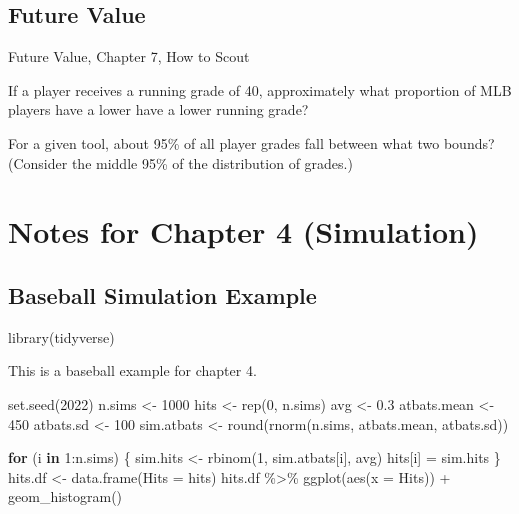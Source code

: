 \documentclass[
  11pt,
]{book}
\newenvironment{Shaded}{\begin{snugshade}}{\end{snugshade}}
\newcommand{\AttributeTok}[1]{\textcolor[rgb]{0.77,0.63,0.00}{#1}}
\newcommand{\ControlFlowTok}[1]{\textcolor[rgb]{0.13,0.29,0.53}{\textbf{#1}}}
\newcommand{\DecValTok}[1]{\textcolor[rgb]{0.00,0.00,0.81}{#1}}
\newcommand{\FloatTok}[1]{\textcolor[rgb]{0.00,0.00,0.81}{#1}}
\newcommand{\FunctionTok}[1]{\textcolor[rgb]{0.00,0.00,0.00}{#1}}
\newcommand{\NormalTok}[1]{#1}
\newcommand{\OtherTok}[1]{\textcolor[rgb]{0.56,0.35,0.01}{#1}}
\newcommand{\SpecialCharTok}[1]{\textcolor[rgb]{0.00,0.00,0.00}{#1}}
\theoremstyle{definition}
\theoremstyle{definition}
\theoremstyle{definition}
\theoremstyle{definition}
\theoremstyle{remark}
\begin{document}
\hypertarget{future-value}{%
\subsection{Future Value}\label{future-value}}

Future Value, Chapter 7, How to Scout \citep{longenhagen2020future}

If a player receives a running grade of 40, approximately what proportion of MLB players have a lower have a lower running grade?

For a given tool, about 95\% of all player grades fall between what two bounds? (Consider the middle 95\% of the distribution of grades.)

\hypertarget{notes-for-chapter-4-simulation}{%
\section{Notes for Chapter 4 (Simulation)}\label{notes-for-chapter-4-simulation}}

\hypertarget{baseball-simulation-example}{%
\subsection{Baseball Simulation Example}\label{baseball-simulation-example}}

\begin{Shaded}
\begin{Highlighting}[]
\FunctionTok{library}\NormalTok{(tidyverse)}
\end{Highlighting}
\end{Shaded}

This is a baseball example for chapter 4.

\begin{Shaded}
\begin{Highlighting}[]
\FunctionTok{set.seed}\NormalTok{(}\DecValTok{2022}\NormalTok{)}
\NormalTok{n.sims }\OtherTok{\textless{}{-}} \DecValTok{1000}
\NormalTok{hits }\OtherTok{\textless{}{-}} \FunctionTok{rep}\NormalTok{(}\DecValTok{0}\NormalTok{, n.sims)}
\NormalTok{avg }\OtherTok{\textless{}{-}} \FloatTok{0.3}
\NormalTok{atbats.mean }\OtherTok{\textless{}{-}} \DecValTok{450}
\NormalTok{atbats.sd }\OtherTok{\textless{}{-}} \DecValTok{100}
\NormalTok{sim.atbats }\OtherTok{\textless{}{-}} \FunctionTok{round}\NormalTok{(}\FunctionTok{rnorm}\NormalTok{(n.sims, atbats.mean, atbats.sd))}

\ControlFlowTok{for}\NormalTok{ (i }\ControlFlowTok{in} \DecValTok{1}\SpecialCharTok{:}\NormalTok{n.sims) \{}
\NormalTok{    sim.hits }\OtherTok{\textless{}{-}} \FunctionTok{rbinom}\NormalTok{(}\DecValTok{1}\NormalTok{, sim.atbats[i], avg)}
\NormalTok{    hits[i] }\OtherTok{=}\NormalTok{ sim.hits}
\NormalTok{\}}
\NormalTok{hits.df }\OtherTok{\textless{}{-}} \FunctionTok{data.frame}\NormalTok{(}\AttributeTok{Hits =}\NormalTok{ hits)}
\NormalTok{hits.df }\SpecialCharTok{\%\textgreater{}\%}
    \FunctionTok{ggplot}\NormalTok{(}\FunctionTok{aes}\NormalTok{(}\AttributeTok{x =}\NormalTok{ Hits)) }\SpecialCharTok{+} \FunctionTok{geom\_histogram}\NormalTok{()}
\end{Highlighting}
\end{Shaded}
\end{document}
